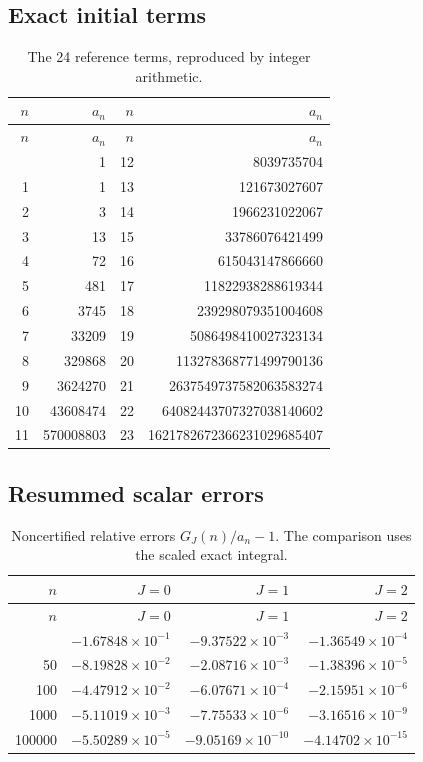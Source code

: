 \subsection{Exact initial terms}
\begin{longtable}{rrrr}
\caption{The 24 reference terms, reproduced by integer arithmetic.}\label{tab:terms}\\
\toprule $n$ & $a_n$ & $n$ & $a_n$ \\ \midrule
\endfirsthead
\toprule $n$ & $a_n$ & $n$ & $a_n$ \\ \midrule
\endhead
\bottomrule\endfoot
0 & 1 & 12 & 8039735704 \\
1 & 1 & 13 & 121673027607 \\
2 & 3 & 14 & 1966231022067 \\
3 & 13 & 15 & 33786076421499 \\
4 & 72 & 16 & 615043147866660 \\
5 & 481 & 17 & 11822938288619344 \\
6 & 3745 & 18 & 239298079351004608 \\
7 & 33209 & 19 & 5086498410027323134 \\
8 & 329868 & 20 & 113278368771499790136 \\
9 & 3624270 & 21 & 2637549737582063583274 \\
10 & 43608474 & 22 & 64082443707327038140602 \\
11 & 570008803 & 23 & 1621782672366231029685407 \\
\end{longtable}
\subsection{Resummed scalar errors}
\begin{longtable}{rrrr}
\caption{Noncertified relative errors $G_J(n)/a_n-1$. The comparison uses the scaled exact integral.}\label{tab:resummed}\\
\toprule $n$ & $J=0$ & $J=1$ & $J=2$ \\ \midrule
\endfirsthead
\toprule $n$ & $J=0$ & $J=1$ & $J=2$ \\ \midrule
\endhead
\bottomrule\endfoot
20 & $-1.67848\times10^{-1}$ & $-9.37522\times10^{-3}$ & $-1.36549\times10^{-4}$ \\
50 & $-8.19828\times10^{-2}$ & $-2.08716\times10^{-3}$ & $-1.38396\times10^{-5}$ \\
100 & $-4.47912\times10^{-2}$ & $-6.07671\times10^{-4}$ & $-2.15951\times10^{-6}$ \\
1000 & $-5.11019\times10^{-3}$ & $-7.75533\times10^{-6}$ & $-3.16516\times10^{-9}$ \\
100000 & $-5.50289\times10^{-5}$ & $-9.05169\times10^{-10}$ & $-4.14702\times10^{-15}$ \\
\end{longtable}
